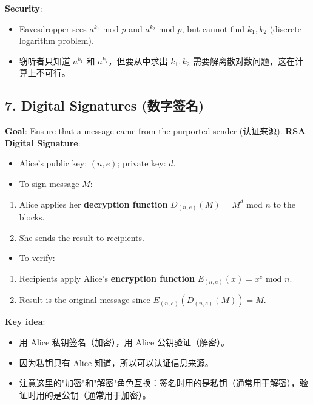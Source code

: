 \documentclass[10pt,a4paper,openany]{ctexbook}
\theoremstyle{definition}
\theoremstyle{remark}
\begin{document}
\textbf{Security}:
\begin{itemize}
\item Eavesdropper sees $a^{k_1} \text{ mod } p$ and $a^{k_2} \text{ mod } p$, but cannot find $k_1, k_2$ (discrete logarithm problem).
\item 窃听者只知道 $a^{k_1}$ 和 $a^{k_2}$，但要从中求出 $k_1, k_2$ 需要解离散对数问题，这在计算上不可行。

\end{itemize}

\vspace{-2pt}

\subsection{7. Digital Signatures (数字签名)}

\textbf{Goal}: Ensure that a message came from the purported sender (认证来源).
\textbf{RSA Digital Signature}:
\begin{itemize}
\item Alice's public key: $(n, e)$; private key: $d$.
\item To sign message $M$:
\end{itemize}

\begin{enumerate}
\item Alice applies her \textbf{decryption function} $D_{(n,e)}(M) = M^d \text{ mod } n$ to the blocks.
\item She sends the result to recipients.
\end{enumerate}

\begin{itemize}
\item To verify:
\end{itemize}

\begin{enumerate}
\item Recipients apply Alice's \textbf{encryption function} $E_{(n,e)}(x) = x^e \text{ mod } n$.
\item Result is the original message since $E_{(n,e)}(D_{(n,e)}(M)) = M$.

\end{enumerate}

\textbf{Key idea}:
\begin{itemize}
\item 用 Alice 私钥签名（加密），用 Alice 公钥验证（解密）。
\item 因为私钥只有 Alice 知道，所以可以认证信息来源。
\item 注意这里的"加密"和"解密"角色互换：签名时用的是私钥（通常用于解密），验证时用的是公钥（通常用于加密）。

\end{itemize}
\end{document}
